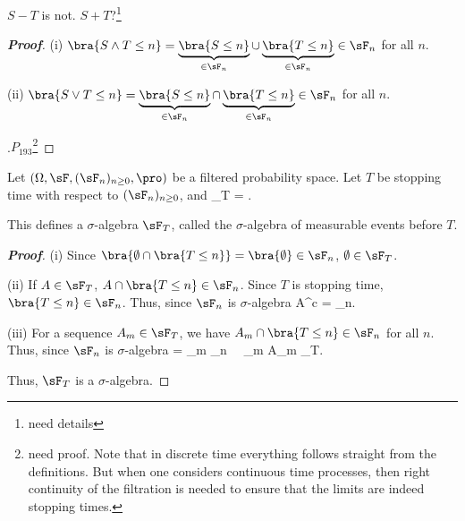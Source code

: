 \begin{remark}
$S-T$ is not. $S+T$?\footnote{need details}
\end{remark}

\begin{proof}[\bf Proof]
\ben \item [(i)] $\bra{S\land T \leq n} = \underbrace{\bra{S\leq n}}_{\in \sF_n}\cup \underbrace{\bra{T\leq n}}_{\in \sF_n} \in \sF_n$ for all $n$.
\item [(ii)] $\bra{S\vee T \leq n} = \underbrace{\bra{S\leq n}}_{\in \sF_n}\cap \underbrace{\bra{T\leq n}}_{\in \sF_n} \in \sF_n$ for all $n$.

\een

\cite{Klenke_2008}.$P_{193}$\footnote{need proof. Note that in discrete time everything follows straight from the definitions. But when one considers continuous time processes, then right continuity of the filtration is
needed to ensure that the limits are indeed stopping times.}
\end{proof}

\begin{definition}\label{def:sigma_algebra_stopping_time_discrete}
Let $(\Omega,\sF, (\sF_n)_{n\geq 0},\pro)$ be a filtered probability space. Let $T$ be stopping time with respect to $(\sF_n)_{n\geq 0}$, and
\be
\sF_T = .
\ee

This defines a $\sigma$-algebra $\sF_T$, called the $\sigma$-algebra of measurable events before $T$.
\end{definition}

\begin{proof}[\bf Proof]
\ben
\item [(i)] Since $\bra{\emptyset \cap \bra{T\leq n}} = \bra{\emptyset} \in \sF_n$, $\emptyset \in \sF_T$.
\item [(ii)] If $A\in \sF_T$, $A \cap \bra{T\leq n} \in \sF_n$. Since $T$ is stopping time, $\bra{T\leq n}\in \sF_n$. Thus, since $\sF_n$ is $\sigma$-algebra
\be
A^c \cap {} =  \bs {} \in \sF_n.
\ee
\item [(iii)] For a sequence $A_m \in \sF_T$, we have $A_m \cap \bra{T\leq n}\in \sF_n$ for all $n$. Thus, since $\sF_n$ is $\sigma$-algebra
\be
{} \cap {} = \bigcup_m  \in \sF_n  \ \ra \ \bigcup_m A_m \in \sF_T.
\ee
\een

Thus, $\sF_T$ is a $\sigma$-algebra.
\end{proof}

